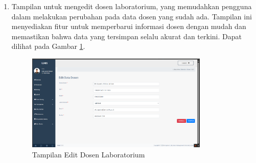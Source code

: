 \begin{enumerate}
	\item Tampilan untuk mengedit dosen laboratorium, yang memudahkan pengguna dalam melakukan perubahan pada data dosen yang sudah ada. Tampilan ini menyediakan fitur untuk memperbarui informasi dosen dengan mudah dan memastikan bahwa data yang tersimpan selalu akurat dan terkini. Dapat dilihat pada Gambar \ref{fig:edit-dosen}.
	      \begin{figure}
		      \centering
		      \includegraphics[width=0.82\textwidth]{konten/gambar/hasil/edit-dosen.png}
		      \caption{Tampilan Edit Dosen Laboratorium}
		      \label{fig:edit-dosen}
	      \end{figure}
\end{enumerate}
